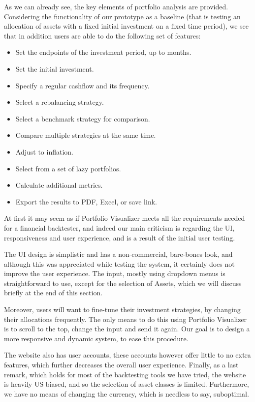 \documentclass[main.tex]{subfiles}
\begin{document}
As we can already see, the key elements of portfolio analysis are provided. Considering the functionality of our prototype as a baseline (that is testing an allocation of assets with a fixed initial investment on a fixed time period), we see that in addition users are able to do the following set of features:

\begin{itemize}
  \item Set the endpoints of the investment period, up to months.
  \item Set the initial investment. 
  \item Specify a regular cashflow and its frequency.
  \item Select a rebalancing strategy.
  \item Select a benchmark strategy for comparison.
  \item Compare multiple strategies at the same time.
  \item Adjust to inflation.
  \item Select from a set of lazy portfolios.
  \item Calculate additional metrics. 
  \item Export the results to PDF, Excel, or save link. 
\end{itemize}

At first it may seem as if Portfolio Visualizer meets all the requirements needed for a financial backtester, and indeed our main criticism is regarding the UI, responsiveness and user experience, and is a result of the initial user testing. 

The UI design is simplistic and has a non-commercial, bare-bones look, and although this was appreciated while testing the system, it certainly does not improve the user experience. The input, mostly using dropdown menus is straightforward to use, except for the selection of Assets, which we will discuss briefly at the end of this section.

Moreover, users will want to fine-tune their investment strategies, by changing their allocations frequently. The only means to do this using Portfolio Visualizer is to scroll to the top, change the input and send it again. Our goal is to design a more responsive and dynamic system, to ease this procedure. 

The website also has user accounts, these accounts however offer little to no extra features, which further decreases the overall user experience. Finally, as a last remark, which holds for most of the backtesting tools we have tried, the website is heavily US biased, and so the selection of asset classes is limited. Furthermore, we have no means of changing the currency, which is needless to say, suboptimal. 
\end{document}
